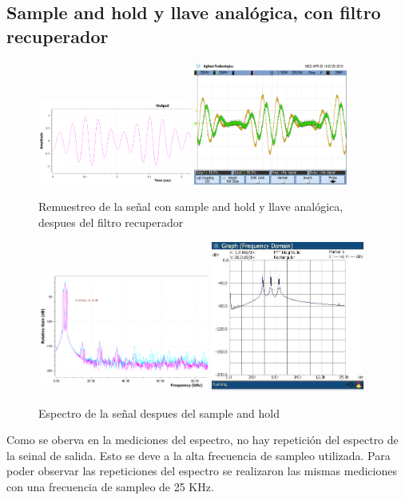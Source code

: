 \documentclass[../../ASSD_TP1_G7.tex]{subfiles}
\begin{document}
\subsection*{Sample and hold y llave analógica, con filtro recuperador}
\begin{figure}[H]
\centering
{}
{\includegraphics[width=0.45\textwidth]{figures/simlyh_pto_7_3.png}}
{\includegraphics[width=0.45\textwidth]{figures/lyh_pto_7_3.png}}
\caption{Remuestreo de la se\~nal con sample and hold y llave analógica, despues del filtro recuperador}
\end{figure}

\begin{figure}[H]
\centering
{}
{\includegraphics[width=0.5\textwidth]{figures/llsyhsimesp.PNG}}
{\includegraphics[width=0.45\textwidth]{figures/syh_llave.jpeg}}
\caption{Espectro de la se\~nal despues del sample and hold}
\end{figure}
Como se oberva en la mediciones del espectro, no hay repetición del espectro de la seinal de salida. Esto se deve a la alta frecuencia de sampleo utilizada. Para poder observar las repeticiones del espectro se realizaron las mismas mediciones con una frecuencia de sampleo de 25 KHz.
\end{document}
